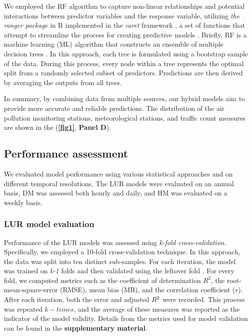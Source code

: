 \documentclass{article}
\begin{document}
We employed the RF algorithm to capture non-linear relationships and potential interactions between predictor variables and the response variable, utilizing \textit{the ranger package} in R implemented in the \textit{caret} framework \cite{wright2019}, a set of functions that attempt to streamline the process for creating predictive models \cite{caret2008}. Briefly, RF is a machine learning (ML) algorithm that constructs an ensemble of multiple decision trees \cite{breiman2001}. In this approach, each tree is formulated using a bootstrap sample of the data. During this process, every node within a tree represents the optimal split from a randomly selected subset of predictors. Predictions are then derived by averaging the outputs from all trees.

In summary, by combining data from multiple sources, our hybrid models aim to provide more accurate and reliable predictions. The distribution of the air pollution monitoring stations, meteorological stations, and traffic count measures are shown in the (\textbf{\cref{fig1}}, \textbf{Panel D}). 

\subsection{Performance assessment}

We evaluated model performance using various statistical approaches and on different temporal resolutions. The LUR models were evaluated on an annual basis, DM was assessed both hourly and daily, and HM was evaluated on a weekly basis.

\subsubsection{LUR model evaluation}
Performance of the LUR models was assessed using \textit{k-fold cross-validation}. Specifically, we employed a 10-fold cross-validation technique. In this approach, the data was split into ten distinct sub-samples. For each iteration, the model was trained on \textit{k-1} folds and then validated using the leftover fold \cite{ziegel2003}. For every fold, we computed metrics such as the coefficient of determination \(R^2\), the root-mean-square-error (RMSE), mean bias (MB), and the correlation coefficient (\(r\)). After each iteration, both the error and adjusted \(R\textsuperscript{2}\) were recorded. This process was repeated \(k-times\), and the average of these measures was reported as the indicator of the model validity. Details from the metrics used for model validation can be found in the \textbf{supplementary material}.\\
\end{document}
